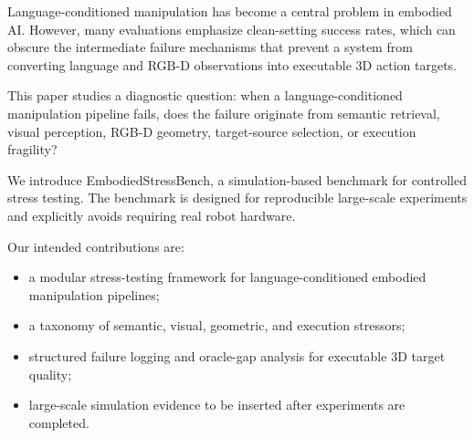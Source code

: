 Language-conditioned manipulation has become a central problem in embodied AI. However, many evaluations emphasize clean-setting success rates, which can obscure the intermediate failure mechanisms that prevent a system from converting language and RGB-D observations into executable 3D action targets.

This paper studies a diagnostic question: when a language-conditioned manipulation pipeline fails, does the failure originate from semantic retrieval, visual perception, RGB-D geometry, target-source selection, or execution fragility?

We introduce EmbodiedStressBench, a simulation-based benchmark for controlled stress testing. The benchmark is designed for reproducible large-scale experiments and explicitly avoids requiring real robot hardware.

Our intended contributions are:
\begin{itemize}
    \item a modular stress-testing framework for language-conditioned embodied manipulation pipelines;
    \item a taxonomy of semantic, visual, geometric, and execution stressors;
    \item structured failure logging and oracle-gap analysis for executable 3D target quality;
    \item large-scale simulation evidence to be inserted after experiments are completed.
\end{itemize}
